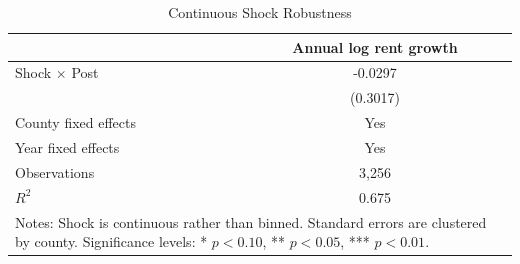 \begin{table}[!htbp]\centering
\caption{Continuous Shock Robustness}\label{tab:continuous_shock}
\begin{tabular}{lc}\toprule
 & Annual log rent growth \\
\midrule
Shock $\times$ Post & -0.0297 \\
 & (0.3017) \\
\midrule
County fixed effects & Yes \\
Year fixed effects & Yes \\
Observations & 3,256 \\
$R^2$ & 0.675 \\
\bottomrule
\multicolumn{2}{p{0.76\textwidth}}{\footnotesize Notes: Shock is continuous rather than binned. Standard errors are clustered by county. Significance levels: * $p<0.10$, ** $p<0.05$, *** $p<0.01$.}
\end{tabular}
\end{table}
